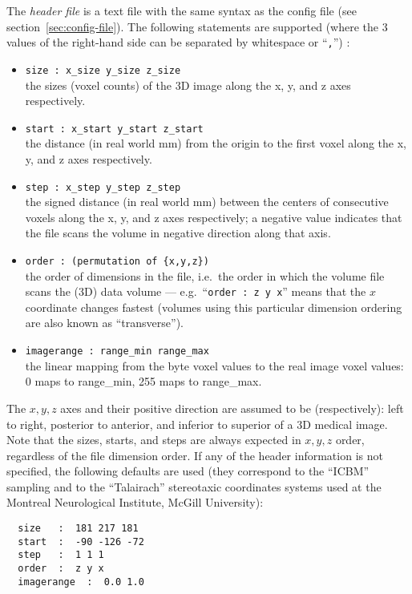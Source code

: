 The \emph{header file} is a text file with the same syntax as the
config file (see section~\ref{sec:config-file}). The following
statements are supported (where the 3 values of the right-hand side
can be separated by whitespace or ``\verb+,+'') :
\begin{itemize}
\item \verb+size : x_size y_size z_size+ \\
  the sizes (voxel counts) of the 3D image along the x, y, and z axes
  respectively.
\item \verb+start : x_start y_start z_start+ \\
  the distance (in real world mm) from the origin to the first voxel
  along the x, y, and z axes respectively.
\item \verb+step : x_step y_step z_step+ \\
  the signed distance (in real world mm) between the centers of
  consecutive voxels along the x, y, and z axes respectively; a
  negative value indicates that the file scans the volume in negative
  direction along that axis.
\item \verb+order : (permutation of {x,y,z})+ \\
  the order of dimensions in the file, i.e.\ the order in which the
  volume file scans the (3D) data volume --- 
  e.g.\ ``\verb+order : z y x+'' means that the $x$ coordinate changes
  fastest (volumes using this particular dimension ordering are also
  known as ``transverse'').
\item \verb+imagerange : range_min range_max+ \\
  the linear mapping from the byte voxel values to the real image
  voxel values: 0 maps to range\_min, 255 maps to range\_max.
\end{itemize}
The $x, y, z$ axes and their positive direction are assumed to be
(respectively): left to right, posterior to anterior, and inferior to
superior of a 3D medical image. Note that the sizes, starts, and steps
are always expected in \mbox{$x, y, z$} order, regardless of the file
dimension order. If any of the header information is not specified,
the following defaults are used (they correspond to the ``ICBM''
sampling and to the ``Talairach'' stereotaxic coordinates systems used
at the Montreal Neurological Institute, McGill University):
\begin{verbatim}
  size   :  181 217 181
  start  :  -90 -126 -72
  step   :  1 1 1
  order  :  z y x
  imagerange  :  0.0 1.0
\end{verbatim}

